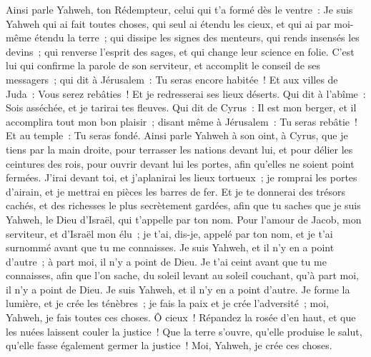 \begin{multicols}{2}
Ainsi parle Yahweh, ton Rédempteur, celui qui t'a formé dès le ventre~: Je suis Yahweh qui ai fait toutes choses, qui seul ai étendu les cieux, et qui ai par moi-même étendu la terre~;
qui dissipe les signes des menteurs, qui rends insensés les devins~; qui renverse l'esprit des sages, et qui change leur science en folie.
C'est lui qui confirme la parole de son serviteur, et accomplit le conseil de ses messagers~; qui dit à Jérusalem~: Tu seras encore habitée~! Et aux villes de Juda~: Vous serez rebâties~! Et je redresserai ses lieux déserts.
Qui dit à l'abîme~: Sois asséchée, et je tarirai tes fleuves.
Qui dit de Cyrus~: Il est mon berger, et il accomplira tout mon bon plaisir~; disant même à Jérusalem~: Tu seras rebâtie~! Et au temple~: Tu seras fondé.
\VerseOne{}Ainsi parle Yahweh à son oint, à Cyrus,
que je tiens par la main droite, pour terrasser les nations devant lui, et pour délier les ceintures des rois, pour ouvrir devant lui les portes, afin qu'elles ne soient point fermées.
J'irai devant toi, et j'aplanirai les lieux tortueux~; je romprai les portes d'airain, et je mettrai en pièces les barres de fer. Et je te donnerai des trésors cachés, et des richesses le plus secrètement gardées, afin que tu saches que je suis Yahweh, le Dieu d'Israël, qui t'appelle par ton nom.
Pour l'amour de Jacob, mon serviteur, et d'Israël mon élu~; je t'ai, dis-je, appelé par ton nom, et je t'ai surnommé avant que tu me connaisses.
Je suis Yahweh, et il n'y en a point d'autre~; à part moi, il n'y a point de Dieu. Je t'ai ceint avant que tu me connaisses,
afin que l'on sache, du soleil levant au soleil couchant, qu'à part moi, il n'y a point de Dieu. Je suis Yahweh, et il n'y en a point d'autre.
Je forme la lumière, et je crée les ténèbres~; je fais la paix et je crée l'adversité~; moi, Yahweh, je fais toutes ces choses.
Ô cieux~! Répandez la rosée d'en haut, et que les nuées laissent couler la justice~! Que la terre s'ouvre, qu'elle produise le salut, qu'elle fasse également germer la justice~! Moi, Yahweh, je crée ces choses.

\end{multicols}
